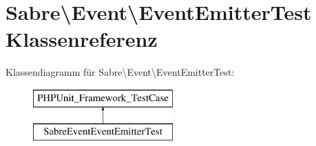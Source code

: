 \hypertarget{class_sabre_1_1_event_1_1_event_emitter_test}{}\section{Sabre\textbackslash{}Event\textbackslash{}Event\+Emitter\+Test Klassenreferenz}
\label{class_sabre_1_1_event_1_1_event_emitter_test}
Klassendiagramm für Sabre\textbackslash{}Event\textbackslash{}Event\+Emitter\+Test\+:\begin{figure}[H]
\begin{center}
\leavevmode
\includegraphics[height=2.000000cm]{class_sabre_1_1_event_1_1_event_emitter_test}
\end{center}
\end{figure}
